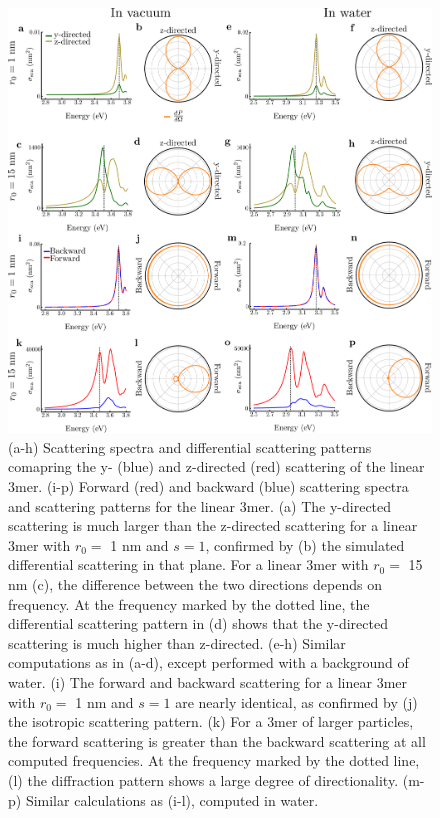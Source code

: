 \documentclass[journal=apchd5,manuscript=article]{achemso}
\begin{document}
\begin{figure}
\includegraphics[width=5.5in]{l3mer_scattering_combined.pdf}
\caption{(a-h) Scattering spectra and differential scattering patterns comapring the y- (blue) and z-directed (red) scattering of the linear 3mer. (i-p) Forward (red) and backward (blue) scattering spectra and scattering patterns for the linear 3mer. (a) The y-directed scattering is much larger than the z-directed scattering for a linear 3mer with $r_0 =$ 1 nm and $s=1$, confirmed by (b) the simulated differential scattering in that plane. For a linear 3mer with $r_0 =$ 15 nm (c), the difference between the two directions depends on frequency. At the frequency marked by the dotted line, the differential scattering pattern in (d) shows that the y-directed scattering is much higher than z-directed. (e-h) Similar computations as in (a-d), except performed with a background of water. (i) The forward and backward scattering for a linear 3mer with $r_0 = $ 1 nm and $s=1$ are nearly identical, as confirmed by (j) the isotropic scattering pattern. (k) For a 3mer of larger particles, the forward scattering is greater than the backward scattering at all computed frequencies. At the frequency marked by the dotted line, (l) the diffraction pattern shows a large degree of directionality. (m-p) Similar calculations as (i-l), computed in water. }
\label{l3mer_combined}
\end{figure}
\end{document}
